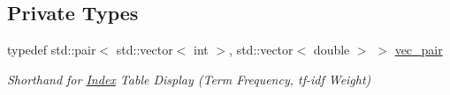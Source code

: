 \subsection*{Private Types}
\begin{DoxyCompactItemize}
\item 
\mbox{\label{class_document_indexer_a8a84f5e40d9364c31e81627270142628}} 
typedef std\+::pair$<$ std\+::vector$<$ int $>$, std\+::vector$<$ double $>$ $>$ \hyperlink{class_document_indexer_a8a84f5e40d9364c31e81627270142628}{vec\+\_\+pair}
\begin{DoxyCompactList}\small\item\em Shorthand for \hyperlink{class_index}{Index} Table Display (Term Frequency, tf-\/idf Weight) \end{DoxyCompactList}\end{DoxyCompactItemize}
